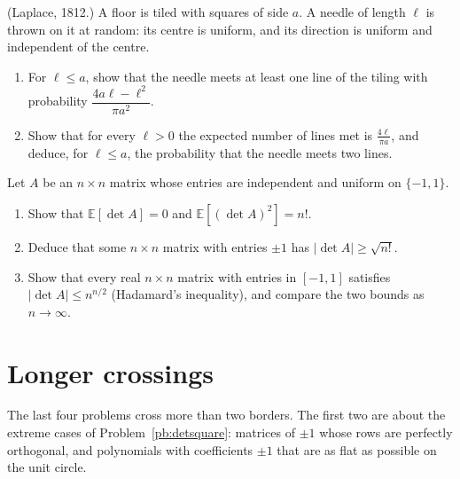 \begin{exercise}[$\star\star$]\label{pb:laplace}
(Laplace, 1812.) A floor is tiled with squares of side $a$. A needle of length $\ell$ is thrown on it at random: its centre
is uniform, and its direction is uniform and independent of the centre.
\begin{enumerate}[label=(\alph*)]
\item For $\ell\le a$, show that the needle meets at least one line of the tiling with probability $\dfrac{4a\ell-\ell^2}{\pi a^2}$.
\item Show that for every $\ell>0$ the expected number of lines met is $\frac{4\ell}{\pi a}$, and deduce, for $\ell\le a$, the
probability that the needle meets two lines.
\end{enumerate}
\end{exercise}

\begin{exercise}[$\star\star$]\label{pb:detsquare}
Let $A$ be an $n\times n$ matrix whose entries are independent and uniform on $\{-1,1\}$.
\begin{enumerate}[label=(\alph*)]
\item Show that $\mathbb E[\det A]=0$ and $\mathbb E[(\det A)^2]=n!$.
\item Deduce that some $n\times n$ matrix with entries $\pm1$ has $|\det A|\ge\sqrt{n!}$.
\item Show that every real $n\times n$ matrix with entries in $[-1,1]$ satisfies $|\det A|\le n^{n/2}$ (Hadamard's
inequality), and compare the two bounds as $n\to\infty$.
\end{enumerate}
\end{exercise}

\section{Longer crossings}

The last four problems cross more than two borders. The first two are about the extreme cases of Problem~\ref{pb:detsquare}:
matrices of $\pm1$ whose rows are perfectly orthogonal, and polynomials with coefficients $\pm1$ that are as flat as possible on
the unit circle.

